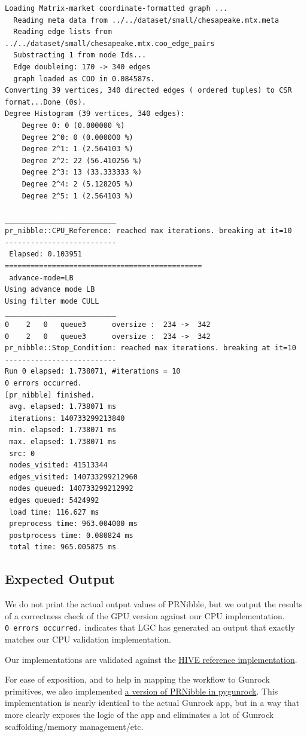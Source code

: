 \documentclass[10pt,oneside]{memoir}
\begin{document}
\begin{verbatim}
Loading Matrix-market coordinate-formatted graph ...
  Reading meta data from ../../dataset/small/chesapeake.mtx.meta
  Reading edge lists from ../../dataset/small/chesapeake.mtx.coo_edge_pairs
  Substracting 1 from node Ids...
  Edge doubleing: 170 -> 340 edges
  graph loaded as COO in 0.084587s.
Converting 39 vertices, 340 directed edges ( ordered tuples) to CSR format...Done (0s).
Degree Histogram (39 vertices, 340 edges):
    Degree 0: 0 (0.000000 %)
    Degree 2^0: 0 (0.000000 %)
    Degree 2^1: 1 (2.564103 %)
    Degree 2^2: 22 (56.410256 %)
    Degree 2^3: 13 (33.333333 %)
    Degree 2^4: 2 (5.128205 %)
    Degree 2^5: 1 (2.564103 %)

__________________________
pr_nibble::CPU_Reference: reached max iterations. breaking at it=10
--------------------------
 Elapsed: 0.103951
==============================================
 advance-mode=LB
Using advance mode LB
Using filter mode CULL
__________________________
0    2   0   queue3      oversize :  234 ->  342
0    2   0   queue3      oversize :  234 ->  342
pr_nibble::Stop_Condition: reached max iterations. breaking at it=10
--------------------------
Run 0 elapsed: 1.738071, #iterations = 10
0 errors occurred.
[pr_nibble] finished.
 avg. elapsed: 1.738071 ms
 iterations: 140733299213840
 min. elapsed: 1.738071 ms
 max. elapsed: 1.738071 ms
 src: 0
 nodes_visited: 41513344
 edges_visited: 140733299212960
 nodes queued: 140733299212992
 edges queued: 5424992
 load time: 116.627 ms
 preprocess time: 963.004000 ms
 postprocess time: 0.080824 ms
 total time: 965.005875 ms
\end{verbatim}

\hypertarget{expected-output-2}{%
\subsection{Expected Output}\label{expected-output-2}}

We do not print the actual output values of PRNibble, but we output the
results of a correctness check of the GPU version against our CPU
implementation. \texttt{0\ errors\ occurred.} indicates that LGC has
generated an output that exactly matches our CPU validation
implementation.

Our implementations are validated against the
\href{https://gitlab.hiveprogram.com/ggillary/local_graph_clustering_socialmedia}{HIVE
reference implementation}.

For ease of exposition, and to help in mapping the workflow to Gunrock
primitives, we also implemented
\href{https://github.com/gunrock/pygunrock/blob/master/apps/pr_nibble.py}{a
version of PRNibble in pygunrock}. This implementation is nearly
identical to the actual Gunrock app, but in a way that more clearly
exposes the logic of the app and eliminates a lot of Gunrock
scaffolding/memory management/etc.
\end{document}
